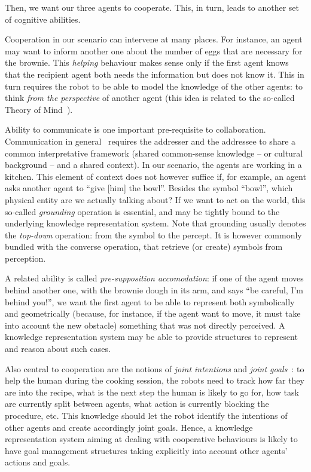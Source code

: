Then, we want our three agents to cooperate. This, in turn, leads to another
set of cognitive abilities.

Cooperation in our scenario can intervene at many places. For instance, an
agent may want to inform another one about the number of eggs that are
necessary for the brownie. This \emph{helping} behaviour makes sense only if
the first agent knows that the recipient agent both needs the information but
does not know it. This in turn requires the robot to be able to model the
knowledge of the other agents: to think \emph{from the perspective} of another
agent (this idea is related to the so-called Theory of Mind~\cite{...}).

Ability to communicate is one important pre-requisite to collaboration.
Communication in general~\cite{Jakobson1960} requires the addresser and the
addressee to share a common interpretative framework (shared common-sense
knowledge -- or cultural background -- and a shared context). In our scenario,
the agents are working in a kitchen. This element of context does not however
suffice if, for example, an agent asks another agent to ``give {[him]} the
bowl''. Besides the symbol ``bowl'', which physical entity are we actually
talking about? If we want to act on the world, this so-called \emph{grounding}
operation is essential, and may be tightly bound to the underlying knowledge
representation system. Note that grounding usually denotes the {\it top-down}
operation: from the symbol to the percept. It is however commonly bundled with
the converse operation, that retrieve (or create) symbols from perception.

A related ability is called \emph{pre-supposition accomodation}: if one of the
agent moves behind another one, with the brownie dough in its arm, and says
``be careful, I'm behind you!'', we want the first agent to be able to
represent both symbolically and geometrically (because, for instance, if the
agent want to move, it must take into account the new obstacle) something that
was not directly perceived. A knowledge representation system may be able to
provide structures to represent and reason about such cases.

Also central to cooperation are the notions of \emph{joint
intentions} and \emph{joint goals}~\cite{Tomasello2005, Bratman2009}: to help
the human during the cooking session, the robots need to track how far
they are into the recipe, what is the next step the human is likely to go for,
how task are currently split between agents, what action is currently
blocking the procedure, etc. This knowledge should let the robot identify the
intentions of other agents and create accordingly joint goals. Hence, a
knowledge representation system aiming at dealing with cooperative behaviours
is likely to have goal management structures taking explicitly into account
other agents' actions and goals.

